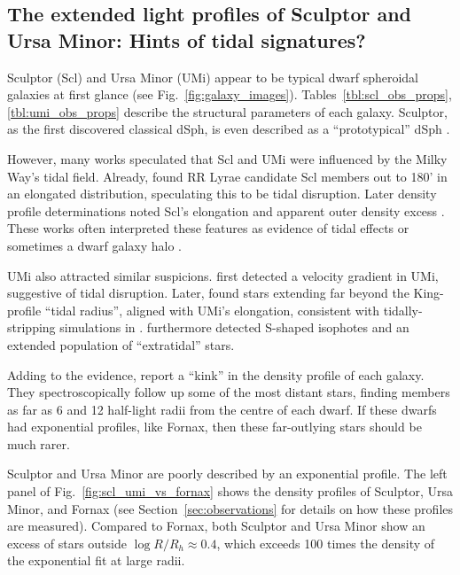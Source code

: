 \subsection{The extended light profiles of Sculptor and Ursa Minor:
Hints of tidal signatures?}\label{sec:scl_umi_obs_tides}

Sculptor (Scl) and Ursa Minor (UMi) appear to be typical dwarf
spheroidal galaxies at first glance (see Fig.~\ref{fig:galaxy_images}).
Tables~\ref{tbl:scl_obs_props}, \ref{tbl:umi_obs_props} describe the
structural parameters of each galaxy. Sculptor, as the first discovered
classical dSph, is even described as a ``prototypical'' dSph
\citep[e.g.,][]{mcconnachie2012}.

However, many works speculated that Scl and UMi were influenced by the
Milky Way's tidal field. Already, \citet{innanen+papp1979} found RR
Lyrae candidate Scl members \citep[from][]{vanagt1978} out to 180' in an
elongated distribution, speculating this to be tidal disruption. Later
density profile determinations noted Scl's elongation and apparent outer
density excess
\citetext{\citealp{eskridge1988}; \citealp{IH1995}; \citealp{walcher+2003}; \citealp{westfall+2006}; \citealp[but
see also][]{coleman+dacosta+bland-hawthorn2005}}. These works often
interpreted these features as evidence of tidal effects
\citep[e.g.,][]{walcher+2003} or sometimes a dwarf galaxy halo
\citep{westfall+2006}.

UMi also attracted similar suspicions. \citet{hargreaves+1994} first
detected a velocity gradient in UMi, suggestive of tidal disruption.
Later, \citet{martinez-delgado+2001} found stars extending far beyond
the King-profile ``tidal radius'', aligned with UMi's elongation,
consistent with tidally-stripping simulations in
\citet{gomez-flechoso+martinez-delgado2003}. \citet{palma+2003}
furthermore detected S-shaped isophotes and an extended population of
``extratidal'' stars.

Adding to the evidence, \citet{sestito+2023a, sestito+2023b} report a
``kink'' in the density profile of each galaxy. They spectroscopically
follow up some of the most distant stars, finding members as far as 6
and 12 half-light radii from the centre of each dwarf. If these dwarfs
had exponential profiles, like Fornax, then these far-outlying stars
should be much rarer.

Sculptor and Ursa Minor are poorly described by an exponential profile.
The left panel of Fig.~\ref{fig:scl_umi_vs_fornax} shows the density
profiles of Sculptor, Ursa Minor, and Fornax (see
Section~\ref{sec:observations} for details on how these profiles are
measured). Compared to Fornax, both Sculptor and Ursa Minor show an
excess of stars outside \(\log R/R_h\approx 0.4\), which exceeds 100
times the density of the exponential fit at large radii.

